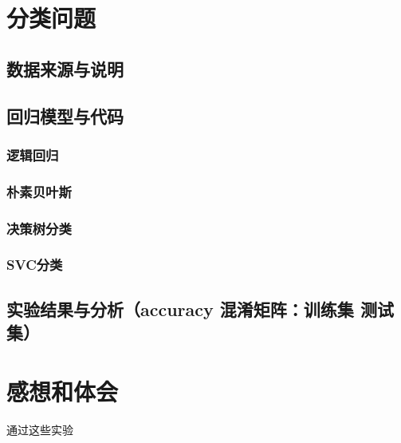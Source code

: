 \documentclass{ds201}
\begin{document}
\section{分类问题}

\subsection{数据来源与说明}

\subsection{回归模型与代码}

\subsubsection{逻辑回归}

\subsubsection{朴素贝叶斯}

\subsubsection{决策树分类}

\subsubsection{SVC分类}

\subsection{实验结果与分析（accuracy 混淆矩阵：训练集 测试集）}

\section{感想和体会}

通过这些实验
\end{document}
